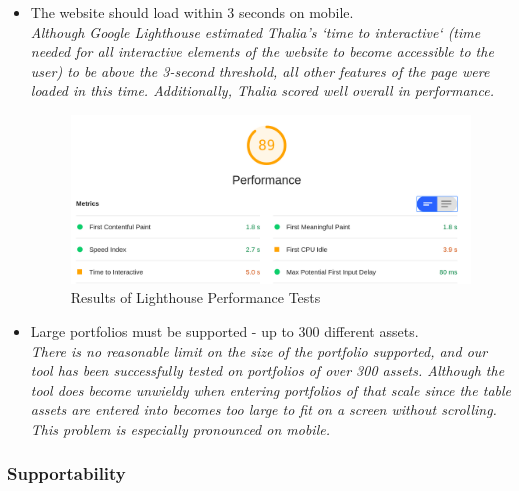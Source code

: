\documentclass[main.tex]{subfiles}
\begin{document}
\begin{itemize}
\item The website should load within 3 seconds on mobile.\\
\textit{Although Google Lighthouse estimated Thalia’s `time to interactive` (time needed for all interactive elements of the website to become accessible to the user) to be above the 3-second threshold, all other features of the page were loaded in this time. Additionally, Thalia scored well overall in performance.}


\begin{figure}[H]
   \centering
   \includegraphics[scale=0.3]{07Evaluation/07Pictures/performanceLighthouse.png}
   \caption{Results of Lighthouse Performance Tests}
   \label{LighthousePerf}
\end{figure}



\item Large portfolios must be supported - up to 300 different assets.\\
\textit{There is no reasonable limit on the size of the portfolio supported, and our tool has been successfully tested on portfolios of over 300 assets. Although the tool does become unwieldy when entering portfolios of that scale since the table assets are entered into becomes too large to fit on a screen without scrolling. This problem is especially pronounced on mobile.}

\end{itemize}

\subsubsection{Supportability}
\end{document}
